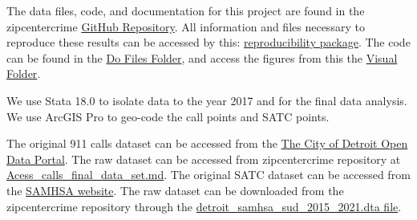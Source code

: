 \documentclass[12pt]{article}
\begin{document}
The data files, code, and documentation for this project are found in the zipcentercrime \href{https://github.com/ecn310/course-project-zipcentercrime}{GitHub Repository}. All information and files necessary to reproduce these results can be accessed by this: \href{https://github.com/ecn310/course-project-zipcentercrime/tree/main/Reproducibility%20Package}{reproducibility package}. The code can be found in the \href{https://github.com/ecn310/course-project-zipcentercrime/tree/main/Reproducibility%20Package/Downloaded_calls/Do_files}{Do Files Folder}, and access the figures from this the \href{https://github.com/ecn310/course-project-zipcentercrime/tree/main/Reproducibility%20Package/Downloaded_calls/Visual_Graphics_Downloaded_calls}{Visual Folder}. 

We use Stata 18.0 to isolate data to the year 2017 and for the final data analysis. We use ArcGIS Pro to geo-code the call points and SATC points. 

The original 911 calls dataset can be accessed from the \href{https://data.detroitmi.gov}{The City of Detroit Open Data Portal}. The raw dataset can be accessed from zipcentercrime repository at \href{https://github.com/ecn310/course-project-zipcentercrime/blob/main/Reproducibility%20Package/RawData/Acess_calls_final_data_set.md}{Acess\_calls\_final\_data\_set.md}. The original SATC dataset can be accessed from the \href{https://www.samhsa.gov}{SAMHSA website}. The raw dataset can be downloaded from the zipcentercrime repository through the \href{https://github.com/ecn310/course-project-zipcentercrime/blob/main/Reproducibility%20Package/RawData/detroit_samhsa_sud_2015_2021.dta}{detroit\_samhsa\_sud\_2015\_2021.dta file}.
\end{document}
